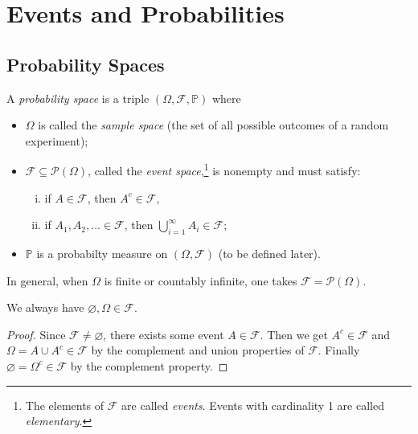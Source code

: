 \chapter{Events and Probabilities}

\section{Probability Spaces}

\begin{definition}
  A \emph{probability space} is a triple
  $(\Omega, \mathcal{F}, \mathbb{P})$
  where
  \begin{itemize}
    \item $\Omega$ is called the \emph{sample space}
      (the set of all possible
      outcomes of a random experiment);
    \item $\mathcal{F} \subseteq \mathcal{P}(\Omega)$,
      called the \emph{event space},\footnote{The elements of $\mathcal{F}$ are called \emph{events}. Events with cardinality 1 are called \emph{elementary}.} is nonempty
      and must satisfy:
      \begin{enumerate}[(i)]
        \item if $A \in \mathcal{F}$, then
          $A^c \in \mathcal{F}$,
        \item if $A_1, A_2, \dots \in \mathcal{F}$,
          then
          $\bigcup_{i=1}^\infty A_i \in \mathcal{F}$;
      \end{enumerate}
    \item $\mathbb{P}$ is a probabilty measure
      on $(\Omega, \mathcal{F})$ (to be defined later).
  \end{itemize}
\end{definition}

\begin{remark}
  In general, when $\Omega$ is finite or countably
  infinite, one takes
  $\mathcal{F} = \mathcal{P}(\Omega)$.
\end{remark}

\begin{prop}
  We always have $\varnothing, \Omega \in \mathcal{F}$.
\end{prop}

\begin{proof}
  Since $\mathcal{F} \ne \varnothing$, there
  exists some event $A \in \mathcal{F}$. Then we get $A^c \in \mathcal{F}$
  and $\Omega = A \cup A^c \in \mathcal{F}$
  by the complement and union properties of
  $\mathcal{F}$. Finally
  $\varnothing = \Omega^c \in \mathcal{F}$
  by the complement property.
\end{proof}

